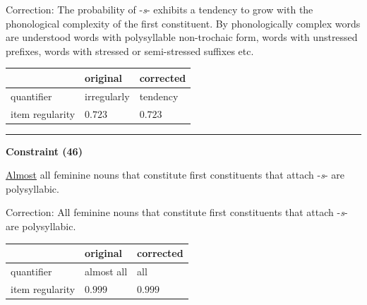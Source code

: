 \noindent
Correction: The probability of -\textit{s}- {exhibits a tendency to grow} with the phonological complexity of the first constituent. By phonologically complex words are understood words with polysyllable non-trochaic form, words with unstressed prefixes, words with stressed or semi-stressed suffixes etc.

\vspace{-0.25em}

\begin{table}[!ht]

\begin{center}

\begin{tabularx}{\columnwidth}{|X|X|X|}
      \hline
                        & original      & corrected \\
      \hline
      quantifier        & irregularly      & tendency   \\
      \hline
      item regularity   & $0.723$      & $0.723$   \\
      \hline
\end{tabularx}
\end{center}
\end{table}

\vspace{-0.75em}
\hrule




\vspace{0.6em}

\begin{center}
\textbf{Constraint (46)}
\end{center}

\noindent
\underline{Almost} all feminine nouns that constitute first constituents that attach -\textit{s}- are polysyllabic.
\vspace{0.3em}

\noindent
Correction: All feminine nouns that constitute first constituents that attach -\textit{s}- are polysyllabic.

\vspace{-0.25em}

\begin{table}[!ht]

\begin{center}

\begin{tabularx}{\columnwidth}{|X|X|X|}
      \hline
                        & original      & corrected \\
      \hline
      quantifier        & almost all      & all   \\
      \hline
      item regularity   & $0.999$      & $0.999$   \\
      \hline
\end{tabularx}
\end{center}
\end{table}
